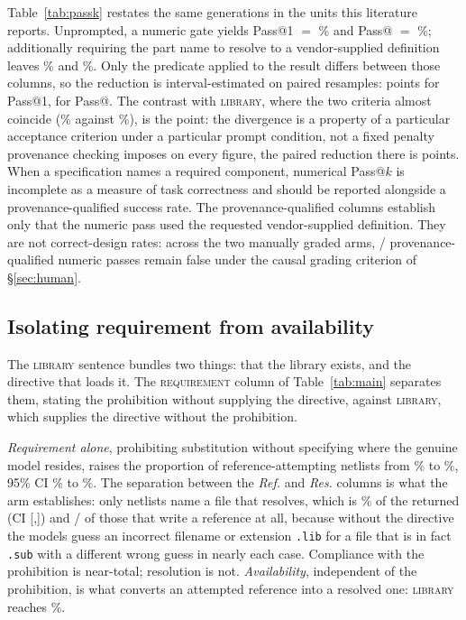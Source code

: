 Table~\ref{tab:passk} restates the same generations in the units this
literature reports. Unprompted, a numeric gate yields Pass@1 $=$
\PassOneBareNumeric{}\% and Pass@\SamplesPerCell{} $=$ \PassKBareNumeric{}\%;
additionally requiring the part name to resolve to a vendor-supplied
definition leaves \PassOneBareProv{}\% and \PassKBareProv{}\%. Only the
predicate applied to the result differs between those columns, so the
reduction is interval-estimated on paired resamples: \PairedDropBareOne{}
points for Pass@1, \PairedDropBareK{} for Pass@\SamplesPerCell{}. The contrast with \textsc{library}, where the
two criteria almost coincide (\PassOneLibNumeric{}\% against
\PassOneLibProv{}\%), is the point: the divergence is a property of a
particular acceptance criterion under a particular prompt condition, not a
fixed penalty provenance checking imposes on every figure, the paired
reduction there is \PairedDropLibOne{} points. When a specification names a
required component, numerical Pass@$k$ is incomplete as a measure of task
correctness and should be reported alongside a provenance-qualified success
rate. The provenance-qualified columns establish only that
the numeric pass used the requested vendor-supplied definition. They are not
correct-design rates: across the two manually graded arms,
\ProvFN{}/\StageProvAccepted{} provenance-qualified numeric passes remain
false under the causal grading criterion of \S\ref{sec:human}.

\subsection{Isolating requirement from availability}
\label{sec:factorial}

The \textsc{library} sentence bundles two things: that the library exists, and
the directive that loads it. The \textsc{requirement} column of
Table~\ref{tab:main} separates them, stating the prohibition without supplying
the directive, against \textsc{library}, which supplies the directive without
the prohibition.



\emph{Requirement alone}, prohibiting substitution without specifying where
the genuine model resides, raises the proportion of reference-attempting
netlists from \FactBareRefRate{}\% to \FactRequirementRefRate{}\%,
95\% CI \FactRequirementRefCILo{}\% to \FactRequirementRefCIHi{}\%. The separation between
the \emph{Ref.} and \emph{Res.} columns is what the arm establishes: only
\FactRequirementRes{} netlists name a file that resolves, which is
\FactRequirementResRate{}\% of the \FactRequirementNet{} returned (CI
[\FactRequirementResCILo{},\FactRequirementResCIHi{}]) and
\FactRequirementRes{}/\FactRequirementRef{} of those that write a reference at
all, because without the
directive the models guess an incorrect filename or extension \texttt{.lib}
for a file that is in fact \texttt{.sub} with a different wrong guess in
nearly each case. Compliance with the prohibition is near-total; resolution
is not. \emph{Availability}, independent of the prohibition, is what converts
an attempted reference into a resolved one: \textsc{library} reaches
\FactLibraryResRate{}\%.


